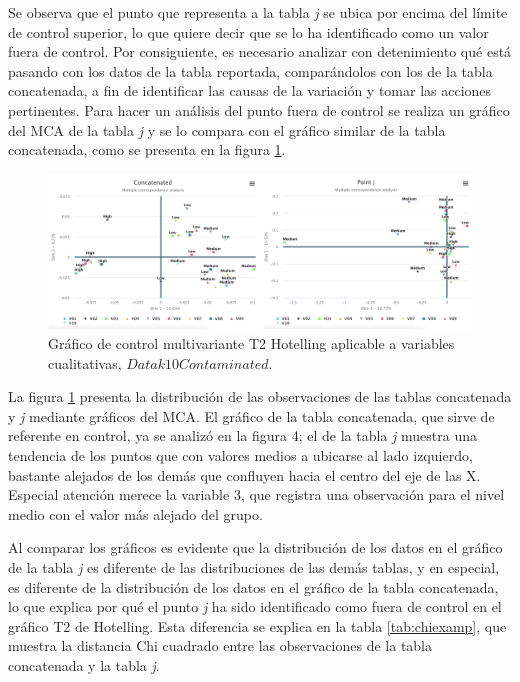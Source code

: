 \documentclass[mathematics,article,submit,moreauthors,pdftex]{mdpi}
\begin{document}
Se observa que el punto que representa a la tabla \emph{j} se ubica por
encima del límite de control superior, lo que quiere decir que se lo ha
identificado como un valor fuera de control. Por consiguiente, es
necesario analizar con detenimiento qué está pasando con los datos de la
tabla reportada, comparándolos con los de la tabla concatenada, a fin de
identificar las causas de la variación y tomar las acciones pertinentes.
Para hacer un análisis del punto fuera de control se realiza un gráfico
del MCA de la tabla \emph{j} y se lo compara con el gráfico similar de
la tabla concatenada, como se presenta en la figura
\ref{fig:comparation}.

\begin{figure}[H]


\begin{center}\includegraphics[width=0.9\linewidth,]{comparation} \end{center}

\caption{Gráfico de control multivariante T2 Hotelling aplicable a variables cualitativas, $Datak10Contaminated$.}

\label{fig:comparation}
\end{figure}

La figura \ref{fig:comparation} presenta la distribución de las
observaciones de las tablas concatenada y \emph{j} mediante gráficos del
MCA. El gráfico de la tabla concatenada, que sirve de referente en
control, ya se analizó en la figura 4; el de la tabla \emph{j} muestra
una tendencia de los puntos que con valores medios a ubicarse al lado
izquierdo, bastante alejados de los demás que confluyen hacia el centro
del eje de las X. Especial atención merece la variable 3, que registra
una observación para el nivel medio con el valor más alejado del grupo.

Al comparar los gráficos es evidente que la distribución de los datos en
el gráfico de la tabla \emph{j} es diferente de las distribuciones de
las demás tablas, y en especial, es diferente de la distribución de los
datos en el gráfico de la tabla concatenada, lo que explica por qué el
punto \emph{j} ha sido identificado como fuera de control en el gráfico
T2 de Hotelling. Esta diferencia se explica en la tabla
\ref{tab:chiexamp}, que muestra la distancia Chi cuadrado entre las
observaciones de la tabla concatenada y la tabla \emph{j}.
\end{document}
